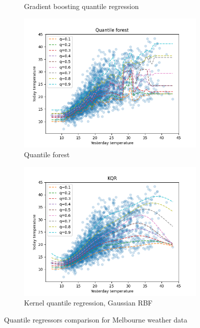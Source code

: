 \begin{figure}[!h]
\begin{subfigure}[b]{0.5\linewidth}
      \caption{Gradient boosting quantile regression} 
      \label{fig:melbourne_gradient_boosting_quantile_regression} 
      \vspace{4ex}
    \end{subfigure} 
    \begin{subfigure}[b]{0.5\linewidth}
      \centering
      \includegraphics[width=1.1\textwidth]{images/melbourne_quantile_forest.png} 
      \caption{Quantile forest} 
      \label{fig:melbourne_quantile_forest} 
    \end{subfigure}%
    \begin{subfigure}[b]{0.5\linewidth}
      \centering
      \includegraphics[width=1.1\textwidth]{images/melbourne_gaussian_rbf_kernel_quantile_regression.png}
      \caption{Kernel quantile regression, Gaussian RBF} 
      \label{fig:melborune_kernel_quantile_regression} 
    \end{subfigure} 
    \caption{Quantile regressors comparison for Melbourne weather data}
    \label{fig:melbourne_quantiles_comparison} 
  \end{figure}


